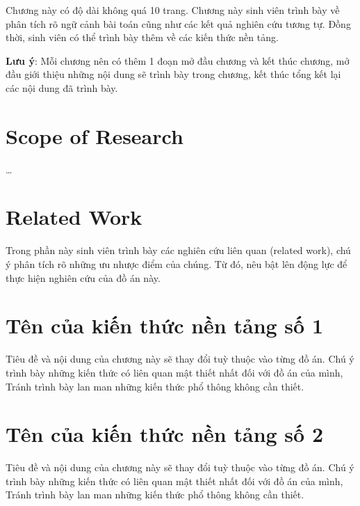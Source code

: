 \documentclass[../main.tex]{subfiles}
\begin{document}
Chương này có độ dài không quá 10 trang. Chương này sinh viên trình bày về phân tích rõ ngữ cảnh bài toán cũng như các kết quả nghiên cứu tương tự. Đồng thời, sinh viên có thể trình bày thêm về các kiến thức nền tảng.

\textbf{Lưu ý}: Mỗi chương nên có thêm 1 đoạn mở đầu chương và kết thúc chương, mở đầu giới thiệu những nội dung sẽ trình bày trong chương, kết thúc tổng kết lại các nội dung đã trình bày.

\section{Scope of Research}
\ldots

\section{Related Work}
Trong phần này sinh viên trình bày các nghiên cứu liên quan (related work), chú ý phân tích rõ những ưu nhược điểm của chúng. Từ đó, nêu bật lên động lực để thực hiện nghiên cứu của đồ án này.


\section{Tên của kiến thức nền tảng số 1}
Tiêu đề và nội dung của chương này sẽ thay đổi tuỳ thuộc vào từng đồ án. Chú ý trình bày những kiến thức có liên quan mật thiết nhất đối với đồ án của mình, Tránh trình bày lan man những kiến thức phổ thông không cần thiết. 

\section{Tên của kiến thức nền tảng số 2}
Tiêu đề và nội dung của chương này sẽ thay đổi tuỳ thuộc vào từng đồ án. Chú ý trình bày những kiến thức có liên quan mật thiết nhất đối với đồ án của mình, Tránh trình bày lan man những kiến thức phổ thông không cần thiết. 
\end{document}
